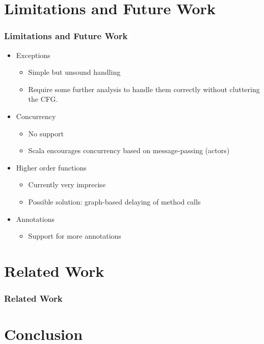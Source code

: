 \documentclass[hyperref={pdfpagelabels=false}]{beamer}
\begin{document}
\section{Limitations and Future Work}
\begin{frame}
\frametitle{Limitations and Future Work}
    \begin{itemize}
        \item Exceptions
        \begin{itemize}
            \item Simple but unsound handling
            \item Require some further analysis to handle them correctly without
cluttering the CFG.
        \end{itemize}
        \item Concurrency
        \begin{itemize}
            \item No support
            \item Scala encourages concurrency based on message-passing (actors)
        \end{itemize}
        \item Higher order functions
        \begin{itemize}
            \item Currently very imprecise
            \item Possible solution: graph-based delaying of method calls
        \end{itemize}
        \item Annotations
        \begin{itemize}
            \item Support for more annotations
        \end{itemize}
    \end{itemize}
\end{frame}

\section{Related Work}
\begin{frame}[allowframebreaks]
    \frametitle{Related Work}
    
    
\end{frame}

\section{Conclusion}
\end{document}
